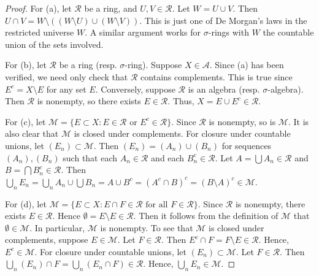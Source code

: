 \documentclass{article}
\begin{document}
\begin{proof}
For (a), let $\mathcal R$ be a ring, and $U, V \in \mathcal R$.  Let $W = U \cup V$.  Then $U \cap V = W \setminus ((W \setminus U) \cup (W \setminus V)) $. This is just one of De Morgan's laws in the restricted universe $W$.  A similar argument works for $\sigma$-rings with $W$ the countable union of the sets involved.

For (b), let $\mathcal R$ be a ring (resp. $\sigma$-ring).  Suppose $X \in \mathcal A$. Since (a) has been verified, we need only check that $\mathcal R$ contains complements.  This is true since $E^c = X \setminus E$ for any set $E$.  Conversely, suppose $\mathcal R$ is an algebra (resp. $\sigma$-algebra).  Then $\mathcal R$ is nonempty, so there exists $E \in \mathcal R$. Thus, $X = E \cup E^c \in \mathcal R$.

For (c), let $\mathcal M = \{ E \subset X : E \in \mathcal R \text{ or } E^c \in \mathcal R \}$.  Since $\mathcal R$ is nonempty, so is $\mathcal M$.  It is also clear that $\mathcal M$ is closed under complements. For closure under countable unions, let $(E_n) \subset \mathcal M$.  Then $(E_n) = (A_n) \cup (B_n)$ for sequences $(A_n), (B_n)$ such that each $A_n \in \mathcal R$ and each $B_n^c \in \mathcal R$. Let $A = \bigcup A_n \in \mathcal R$ and $B = \bigcap B_n^c \in \mathcal R$.  Then $\bigcup_n E_n = \bigcup_n A_n \cup \bigcup B_n = A \cup B^c = (A^c \cap B)^c = (B \setminus A)^c \in \mathcal M$. 

For (d), let $\mathcal M = \{ E \subset X : E \cap F \in \mathcal R \text{ for all } F \in \mathcal R \}$. Since $\mathcal R$ is nonempty, there exists $E \in \mathcal R$.  Hence $\emptyset = E \setminus E \in \mathcal R$. Then it follows from the definition of $\mathcal M$ that $\emptyset \in \mathcal M$. In particular, $\mathcal M$ is nonempty.  To see that $\mathcal M$ is closed under complements, suppose $E \in \mathcal M$.  Let $F \in \mathcal R$.  Then $E^c \cap F = F \setminus E \in \mathcal R$.  Hence, $E^c \in \mathcal M$.  For closure under countable unions, let $(E_n) \subset \mathcal M$. Let $F \in \mathcal R$.  Then $\bigcup_n(E_n) \cap F = \bigcup_n (E_n \cap F)  \in \mathcal R$.  Hence, $\bigcup_n E_n \in \mathcal M$.
\end{proof}
\end{document}
